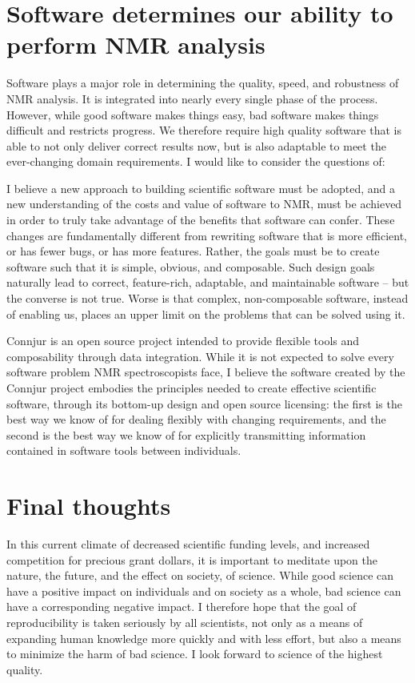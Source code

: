 \section{Software determines our ability to perform NMR analysis}
Software plays a major role in determining the quality, speed, and robustness
of NMR analysis.  It is integrated into nearly every single phase of the 
process.  However, while good software makes things easy, bad software makes
things difficult and restricts progress.  We therefore require high quality
software that is able to not only deliver correct results now, but is also
adaptable to meet the ever-changing domain requirements.  I would like to 
consider the questions of: 

I believe a new approach to building scientific software must be adopted, and 
a new understanding of the costs and value of software to NMR, must be 
achieved in order to truly take advantage of the benefits that software can
confer.  These changes are fundamentally different from rewriting software
that is more efficient, or has fewer bugs, or has more features.  Rather, the
goals must be to create software such that it is simple, obvious, and 
composable.  Such design goals naturally lead to correct, feature-rich, 
adaptable, and maintainable software -- but the converse is not true.  Worse
is that complex, non-composable software, instead of enabling
us, places an upper limit on the problems that can be solved using it.

Connjur is an open source project intended to provide flexible tools and composability
through data integration.  While it is not expected to solve every software
problem NMR spectroscopists face, I believe the software created by the Connjur
project embodies the principles needed to create effective scientific
software, through its bottom-up design and open source licensing:
the first is the best way we know of for dealing flexibly with changing
requirements, and the second is the best way we know of for explicitly 
transmitting information contained in software tools between individuals.


\section{Final thoughts}
In this current climate of decreased scientific funding levels, and increased
competition for precious grant dollars, it is important to meditate upon the
nature, the future, and the effect on society, of science.
While good science can have a positive impact on individuals and on society 
as a whole, bad science can have a corresponding negative impact.
I therefore hope that the goal of reproducibility is taken seriously by all
scientists, not only as a means of expanding human knowledge more quickly and
with less effort, but also a means to minimize the harm of bad science.
I look forward to science of the highest quality.

